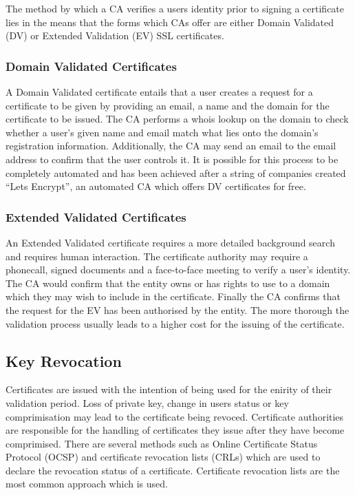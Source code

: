 The method by which a CA verifies a users identity prior to signing a certificate lies in the means that the forms which CAs offer are either Domain Validated (DV) or Extended Validation (EV) SSL certificates.
\subsubsection{Domain Validated Certificates}

A Domain Validated certificate entails that a user creates a request for a certificate to be given by providing an email, a name and the domain for the certificate to be issued. The CA performs a whois lookup on the domain to check whether a user’s given name and email match what lies onto the domain’s registration information. Additionally, the CA may send an email to the email address to confirm that the user controls it. It is possible for this process to be completely automated and has been achieved after a string of companies created “Lets Encrypt”, an automated CA which offers DV certificates for free.

\subsubsection{Extended Validated Certificates}

An Extended Validated certificate requires a more detailed background search and requires human interaction. The certificate authority may require a phonecall, signed documents and a face-to-face meeting to verify a user's identity. The CA would confirm that the entity owns or has rights to use to a domain which they may wish to include in the certificate. Finally the CA confirms that the request for the EV has been authorised by the entity. The more thorough the validation process usually leads to a higher cost for the issuing of the certificate.

\subsection{Key Revocation}
Certificates are issued with the intention of being used for the enirity of their validation period. Loss of private key, change in users status or key comprimisation may lead to the certificate being revoced. Certificate authorities are responsible for the handling of certificates they issue after they have become comprimised. There are several methods such as Online Certificate Status Protocol (OCSP) and certificate revocation lists (CRLs) which are used to declare the revocation status of a certificate. Certificate revocation lists are the most common approach which is used.


